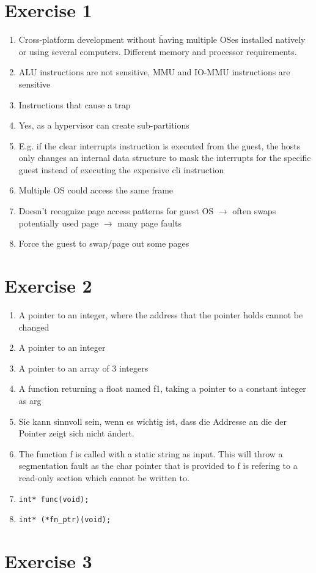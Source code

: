 \documentclass[a4paper,10pt]{article}
\begin{document}
\section*{Exercise 1}
    \begin{enumerate}
        \item Cross-platform development without ĥaving multiple OSes installed natively or using several computers. Different memory and processor requirements. 
        \item ALU instructions are not sensitive, MMU and IO-MMU instructions are sensitive
        \item Instructions that cause a trap
        \item Yes, as a hypervisor can create sub-partitions
        \item E.g. if the clear interrupts instruction is executed from the guest, the hosts only changes an internal data structure to mask the interrupts for the specific guest instead of executing the expensive cli instruction
        \item Multiple OS could access the same frame
        \item Doesn't recognize page access patterns for guest OS $\rightarrow$ often swaps potentially used page $\rightarrow$ many page faults
        \item Force the guest to swap/page out some pages
    \end{enumerate}

\section*{Exercise 2}
    \begin{enumerate}
        \item A pointer to an integer, where the address that the pointer holds cannot be changed
        \item A pointer to an integer
        \item A pointer to an array of 3 integers
        \item A function returning a float named f1, taking a pointer to a constant integer as arg
        \item Sie kann sinnvoll sein, wenn es wichtig ist, dass die Addresse an die der Pointer zeigt sich nicht ändert.
        \item The function f is called with a static string as input. This will throw a segmentation fault as the char pointer that is provided to f is refering to a read-only section which cannot be written to.
        \item \texttt{int* func(void);}
        \item \texttt{int* (*fn_ptr)(void);}
    \end{enumerate}

\section*{Exercise 3}
\end{document}
